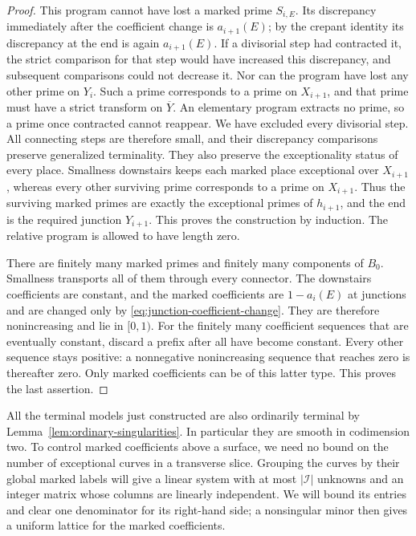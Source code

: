 \documentclass[11pt]{amsart}
\theoremstyle{definition}
\theoremstyle{remark}
\numberwithin{equation}{section}
\begin{document}
\begin{proof}
This program cannot have lost a marked prime $S_{i,E}$.  Its discrepancy
immediately after the coefficient change is $a_{i+1}(E)$; by the crepant
identity its discrepancy at the end is again $a_{i+1}(E)$.  If a divisorial
step had contracted it, the strict comparison for that step would have
increased this discrepancy, and subsequent comparisons could not decrease
it.  Nor can the program have lost any other prime on $Y_i$.  Such a prime
corresponds to a prime on $X_{i+1}$, and that prime must have a strict
transform on $\overline Y$.  An elementary program extracts no prime, so a
prime once contracted cannot reappear.  We have excluded every divisorial
step.  All connecting steps are therefore small, and their discrepancy
comparisons preserve generalized terminality.  They also preserve the
exceptionality status of every place.  Smallness downstairs keeps each
marked place exceptional over $X_{i+1}$, whereas every other surviving
prime corresponds to a prime on $X_{i+1}$.  Thus the surviving marked
primes are exactly the exceptional primes of $h_{i+1}$, and the end is the
required junction $Y_{i+1}$.  This proves the construction by induction.  The
relative program is allowed to have length zero.

There are finitely many marked primes and finitely many components of
$B_0$.  Smallness transports all of them through every connector.  The
downstairs coefficients are constant, and the marked coefficients are
$1-a_i(E)$ at junctions and are changed only by
\eqref{eq:junction-coefficient-change}.  They are therefore nonincreasing
and lie in $[0,1)$.  For the finitely many coefficient sequences that are
eventually constant, discard a prefix after all have become constant.
Every other sequence stays positive: a nonnegative nonincreasing sequence
that reaches zero is thereafter zero.  Only marked coefficients can be of
this latter type.  This proves the last assertion.
\end{proof}

All the terminal models just constructed are also ordinarily terminal by
Lemma~\ref{lem:ordinary-singularities}.  In particular they are smooth in
codimension two.  To control marked coefficients above a surface, we need
no bound on the number of exceptional curves in a transverse slice.
Grouping the curves by their global marked labels will give a linear
system with at most $|\mathcal I|$ unknowns and an integer matrix whose
columns are linearly independent.  We will bound its entries and clear one denominator for
its right-hand side; a nonsingular minor then gives a uniform lattice for
the marked coefficients.
\end{document}
